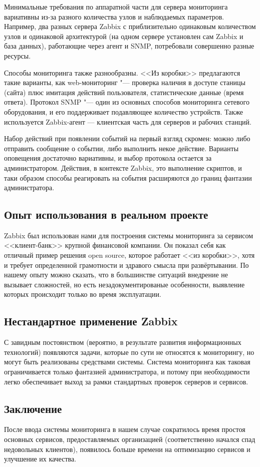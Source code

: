 \documentclass[10pt, a5paper]{article}
\begin{document}
Минимальные требования по аппаратной части для сервера мониторинга вариативны из-за разного количества узлов и наблюдаемых параметров.  Например, два разных сервера Zabbix с приблизительно одинаковым количеством узлов и одинаковой архитектурой (на одном сервере установлен сам Zabbix и база данных), работающие через агент и SNMP, потребовали совершенно разные ресурсы.

Способы мониторинга также разнообразны. <<Из коробки>> предлагаются такие варианты, как web-мониторинг "--- проверка наличия в доступе станицы (сайта) плюс имитация действий пользователя, статистические данные (время ответа). Протокол SNMP "--- один из основных способов мониторинга сетевого оборудования, и его поддерживает подавляющее количество устройств. Также используется Zabbix-агент — клиентская часть для серверов и рабочих станций.

Набор действий при появлении событий на первый взгляд скромен: можно либо отправить сообщение о событии, либо выполнить некое действие. Варианты оповещения достаточно вариативны, и выбор протокола остается за администратором. Действия, в контексте Zabbix, это выполнение скриптов, и таки образом способы реагировать на события расширяются до границ фантазии администратора.

\subsection*{Опыт использования в реальном проекте}

Zabbix был использован нами для построения системы мониторинга за сервисом <<клиент-банк>> крупной  финансовой компании. Он показал себя как отличный пример  решения open source, которое работает <<из коробки>>, хотя и требует определенной грамотности и здравого смысла при развёртывании. По нашему опыту можно сказать, что в большинстве ситуаций внедрение не вызывает сложностей, но есть незадокументированые особенности, выявление которых происходит только во время эксплуатации.

\subsection*{Нестандартное применение Zabbix}

С завидным постоянством (вероятно, в результате развития информационных технологий) появляются задачи, которые по сути не относятся к мониторингу, но могут быть реализованы средствами системы. Система мониторинга как таковая ограничивается только  фантазией администратора, и потому при необходимости легко обеспечивает выход за рамки стандартных проверок серверов и сервисов.

\subsection*{Заключение}

После ввода системы мониторинга в нашем случае сократилось время простоя основных сервисов, предоставляемых организацией (соответственно начался спад недовольных клиентов), появилось больше времени на оптимизацию сервисов и улучшение их качества.
\end{document}
